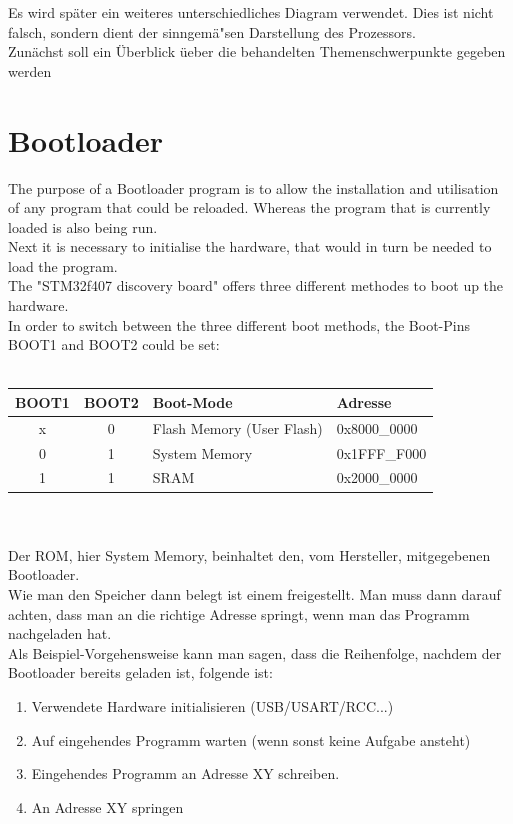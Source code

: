 Es wird sp\"ater ein weiteres unterschiedliches Diagram verwendet. Dies ist nicht
falsch, sondern dient der sinngem\"a"sen Darstellung des Prozessors.\\


Zun\"achst soll ein \"Uberblick \"ueber die behandelten Themenschwerpunkte gegeben
 werden 

\section{Bootloader}
The purpose of a Bootloader program is to allow the installation and utilisation 
of any program that could be reloaded. Whereas the program that is currently loaded is also being run.\\
Next it is necessary to initialise the hardware, that would in turn be needed to load the program.\\
The "STM32f407 discovery board" offers three different methodes to boot up the hardware.\\
In order to switch between the three different boot methods, the Boot-Pins BOOT1
and BOOT2 could be set:\\\\
\begin{tabular}{|c|c|l|l|}
\hline \hline
  BOOT1 & BOOT2 & Boot-Mode & Adresse\\ \hline
  x & 0 & Flash Memory (User Flash) & 0x8000\_0000\\
\hline
  0 & 1 & System Memory & 0x1FFF\_F000\\
\hline
 1  & 1 & SRAM & 0x2000\_0000\\
\hline
\end{tabular}\\\\
Der ROM, hier System Memory, beinhaltet den, vom Hersteller, mitgegebenen
 Bootloader.\\
Wie man den Speicher dann belegt ist einem freigestellt. Man muss dann darauf
achten, dass man an die richtige Adresse springt, wenn man das Programm nachgeladen
hat.\\
Als Beispiel-Vorgehensweise kann man sagen, dass die Reihenfolge, nachdem der
Bootloader bereits geladen ist, folgende ist:\\

\begin{enumerate}
\item Verwendete Hardware initialisieren (USB/USART/RCC...)
\item Auf eingehendes Programm warten (wenn sonst keine Aufgabe ansteht)
\item Eingehendes Programm an Adresse XY schreiben.
\item An Adresse XY springen
\end{enumerate}

